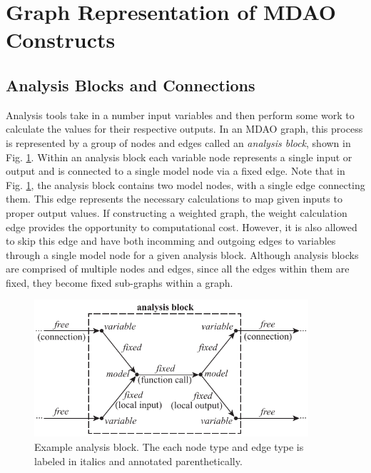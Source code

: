\section{Graph Representation of MDAO Constructs}
\subsection{Analysis Blocks and Connections}
Analysis tools take in a number input variables and then perform some work to calculate 
the values for their respective outputs. In an MDAO graph, this process is 
represented by a group of nodes and edges called an \emph{analysis block}, 
shown in Fig. \ref{f:analysis block}. Within an analysis block each variable 
node represents a single input or output and is connected 
to a single model node via a fixed edge. Note that in Fig. \ref{f:analysis block}, 
the analysis block contains two model nodes, with a single edge connecting them. 
This edge represents the necessary calculations to map given inputs 
to proper output values. If constructing a weighted graph, the weight calculation edge 
provides the opportunity to computational cost. However, it is also allowed to skip 
this edge and have both incomming and outgoing edges to variables through a single model 
node for a given analysis block. Although analysis blocks are comprised of multiple nodes and edges, since all 
the edges within them are fixed, they become fixed sub-graphs within a graph.

\begin{figure}[htb!]
    \begin{center}
    \includegraphics[width=4in]{images/analysis_block}
    \end{center}
    \vspace{-10pt}
\caption{Example analysis block. The each node type and edge type is labeled in italics and annotated parenthetically.}
\label{f:analysis block}
\end{figure}

